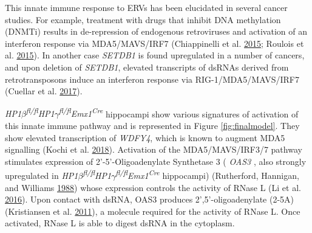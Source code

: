 \documentclass[onehalf,12pt]{beavtex}
\begin{document}
  This innate immune response to ERVs has been elucidated in several
  cancer studies. For example, treatment with drugs that inhibit DNA
  methylation (DNMTi) results in de-repression of endogenous retroviruses
  and activation of an interferon response via MDA5/MAVS/IRF7
  (Chiappinelli et al.
  \protect\hyperlink{ref-ChiappinelliInhibitingDNAMethylation2015}{2015};
  Roulois et al.
  \protect\hyperlink{ref-RouloisDNADemethylatingAgentsTarget2015a}{2015}).
  In another case \emph{SETDB1} is found upregulated in a number of
  cancers, and upon deletion of \emph{SETDB1}, elevated transcripts of
  dsRNAs derived from retrotransposons induce an interferon response via
  RIG-1/MDA5/MAVS/IRF7 (Cuellar et al.
  \protect\hyperlink{ref-CuellarSilencingretrotransposonsSETDB12017}{2017}).
  
  \emph{HP1\(\beta\)\textsuperscript{fl/fl}HP1\(\gamma\)\textsuperscript{fl/fl}Emx1\textsuperscript{Cre}}
  hippocampi show various signatures of activation of this innate immune
  pathway and is represented in Figure \ref{fig:finalmodel}. They show
  elevated transcription of \emph{WDFY4}, which is known to augment MDA5
  signalling (Kochi et al.
  \protect\hyperlink{ref-KochiSplicingvariantWDFY42018a}{2018}).
  Activation of the MDA5/MAVS/IRF3/7 pathway stimulates expression of
  2'-5'-Oligoadenylate Synthetase 3 ( \emph{OAS3} , also strongly
  upregulated in
  \emph{HP1\(\beta\)\textsuperscript{fl/fl}HP1\(\gamma\)\textsuperscript{fl/fl}Emx1\textsuperscript{Cre}}
  hippocampi) (Rutherford, Hannigan, and Williams
  \protect\hyperlink{ref-RutherfordInterferoninducedbinding1988}{1988})
  whose expression controls the activity of RNase L (Li et al.
  \protect\hyperlink{ref-LiActivationRNasedependent2016}{2016}). Upon
  contact with dsRNA, OAS3 produces 2',5'-oligoadenylate (2-5A)
  (Kristiansen et al.
  \protect\hyperlink{ref-Kristiansenoligoadenylatesynthetasefamily2011}{2011}),
  a molecule required for the activity of RNase L. Once activated, RNase L
  is able to digest dsRNA in the cytoplasm.
  
\end{document}
